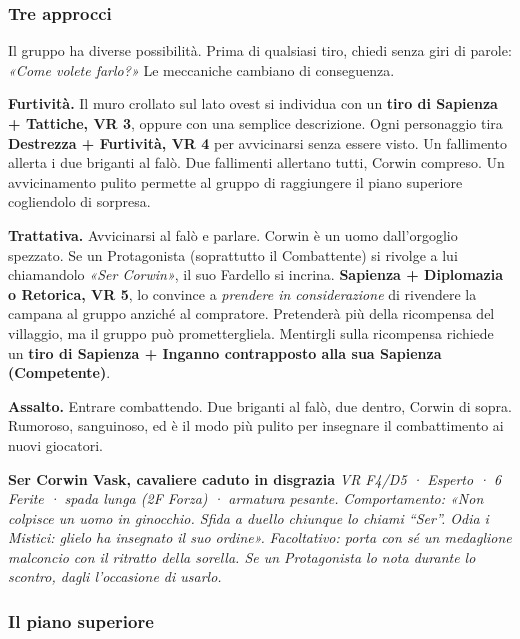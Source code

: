 \documentclass[10pt,a4paper]{article}
\begin{document}
\subsubsection{Tre approcci}\label{tre-approcci}

Il gruppo ha diverse possibilità. Prima di qualsiasi tiro, chiedi senza giri di parole: \emph{«Come volete farlo?»} Le meccaniche cambiano di conseguenza.

\textbf{Furtività.} Il muro crollato sul lato ovest si individua con un \textbf{tiro di Sapienza + Tattiche, VR 3}, oppure con una semplice descrizione. Ogni personaggio tira \textbf{Destrezza + Furtività, VR 4} per avvicinarsi senza essere visto. Un fallimento allerta i due briganti al falò. Due fallimenti allertano tutti, Corwin compreso. Un avvicinamento pulito permette al gruppo di raggiungere il piano superiore cogliendolo di sorpresa.

\par{}\noindent\textbf{Trattativa.} Avvicinarsi al falò e parlare. Corwin è un uomo dall'orgoglio spezzato. Se un Protagonista (soprattutto il Combattente) si rivolge a lui chiamandolo \emph{«Ser Corwin»}, il suo Fardello si incrina. \textbf{Sapienza + Diplomazia o Retorica, VR 5}, lo convince a \emph{prendere in considerazione} di rivendere la campana al gruppo anziché al compratore. Pretenderà più della ricompensa del villaggio, ma il gruppo può promettergliela. Mentirgli sulla ricompensa richiede un \textbf{tiro di Sapienza + Inganno contrapposto alla sua Sapienza (Competente)}.

\textbf{Assalto.} Entrare combattendo. Due briganti al falò, due dentro, Corwin di sopra. Rumoroso, sanguinoso, ed è il modo più pulito per insegnare il combattimento ai nuovi giocatori.

\par\smallskip\begin{rpgnote}[fontupper=\normalfont]\textbf{Ser Corwin Vask, cavaliere caduto in disgrazia} \emph{VR F4/D5 · Esperto · 6 Ferite · spada lunga (2F Forza) · armatura pesante.} \emph{Comportamento: «Non colpisce un uomo in ginocchio. Sfida a duello chiunque lo chiami “Ser”. Odia i Mistici: glielo ha insegnato il suo ordine».} \emph{Facoltativo: porta con sé un medaglione malconcio con il ritratto della sorella. Se un Protagonista lo nota durante lo scontro, dagli l'occasione di usarlo.}\end{rpgnote}\par\smallskip
\subsubsection{Il piano superiore}\label{il-piano-superiore}
\end{document}
